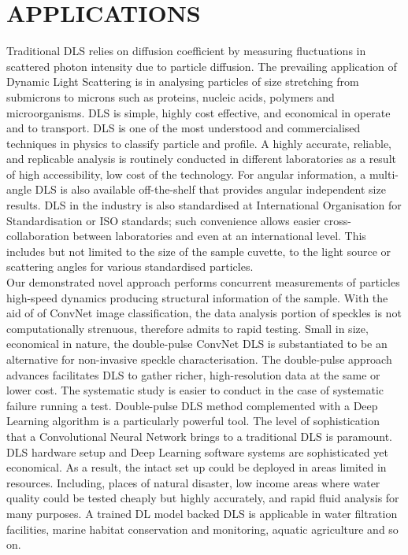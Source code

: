 \cleardoublepage


\chapter{APPLICATIONS}

Traditional DLS relies on diffusion coefficient by measuring fluctuations in scattered photon intensity due to particle diffusion. The prevailing application of Dynamic Light Scattering is in analysing particles of size stretching from submicrons to microns such as proteins, nucleic acids, polymers and microorganisms. DLS is simple, highly cost effective, and economical in operate and to transport. DLS is one of the most understood and commercialised techniques in physics to classify particle and profile. A highly accurate, reliable, and replicable analysis is routinely conducted in different laboratories as a result of high accessibility, low cost of the technology. For angular information, a multi-angle DLS is also available off-the-shelf that provides angular independent size results. DLS in the industry is also standardised at International Organisation for Standardisation or ISO standards; such convenience allows easier cross-collaboration between laboratories and even at an international level. This includes but not limited to the size of the sample cuvette, to the light source or scattering angles for various standardised particles. \\

Our demonstrated novel approach performs concurrent measurements of particles high-speed dynamics producing structural information of the sample. With the aid of of ConvNet image classification, the data analysis portion of speckles is not computationally strenuous, therefore admits to rapid testing. Small in size, economical in nature, the double-pulse ConvNet DLS is substantiated to be an alternative for non-invasive speckle characterisation. The double-pulse approach advances facilitates DLS to gather richer, high-resolution data at the same or lower cost. The systematic study is easier to conduct in the case of systematic failure running a test. Double-pulse DLS method complemented with a Deep Learning algorithm is a particularly powerful tool. The level of sophistication that a Convolutional Neural Network brings to a traditional DLS is paramount. \\

DLS hardware setup and Deep Learning software systems are sophisticated yet economical. As a result, the intact set up could be deployed in areas limited in resources. Including, places of natural disaster, low income areas where water quality could be tested cheaply but highly accurately, and rapid fluid analysis for many purposes. A trained DL model backed DLS is applicable in water filtration facilities, marine habitat conservation and monitoring, aquatic agriculture and so on.\\



